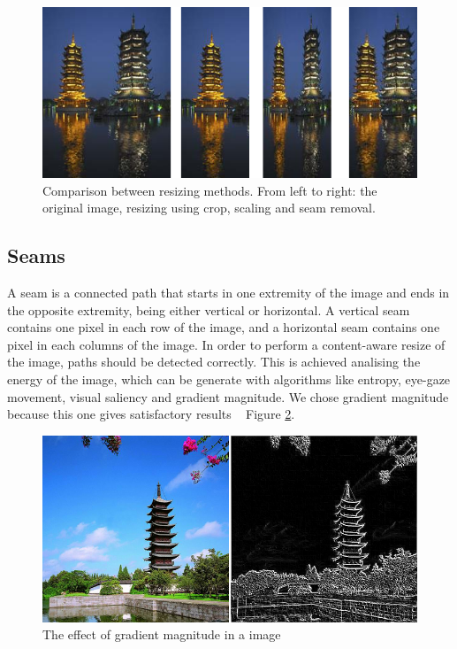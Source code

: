 \documentclass{article}
\begin{document}
	\begin{figure} [H]
		\centering
		\includegraphics[scale=0.5]{images/intelligent3}
		\caption{Comparison between resizing methods. From left to right: the original image, resizing using crop, scaling and seam removal.\label{intelligent1}}
	\end{figure}

	\subsection{Seams}
	A seam is a connected path that starts in one extremity of the image and ends in the opposite extremity, being either vertical or horizontal. A vertical seam contains one pixel in each row of the image, and a horizontal seam contains one pixel in each columns of the image. In order to perform a content-aware resize of the image, paths should be detected correctly. This is achieved analising the energy of the image, which can be generate with algorithms like entropy, eye-gaze movement, visual saliency and gradient magnitude. We chose gradient magnitude because this one gives satisfactory results ~\cite{ref:seamwiki} Figure \ref{castle}.

	\begin{figure} [H]
		\centering
		\includegraphics[scale=0.5]{images/intelligent2}
		\caption{The effect of gradient magnitude in a image\label{castle}}
	\end{figure}
\end{document}
